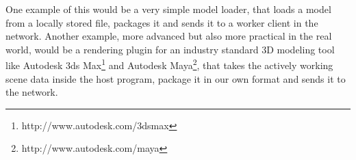 One example of this would be a very simple model loader, that loads a model from a locally stored file, packages it and sends it to a worker client in the network. Another example, more advanced but also more practical in the real world, would be a rendering plugin for an industry standard 3D modeling tool like Autodesk 3ds Max\footnote{http://www.autodesk.com/3dsmax} and Autodesk Maya\footnote{http://www.autodesk.com/maya}, that takes the actively working scene data inside the host program, package it in our own format and sends it to the network.


